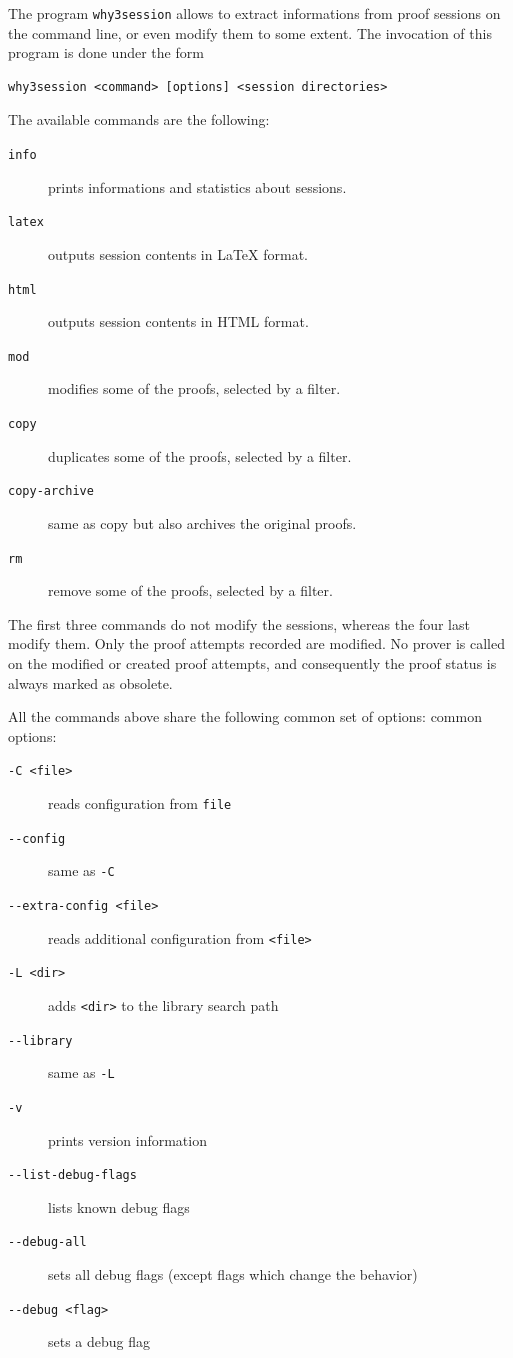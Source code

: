 The program \texttt{why3session} allows to extract informations from
proof sessions on the command line, or even modify them to some
extent. The invocation of this program is done under the form
\begin{verbatim}
why3session <command> [options] <session directories>
\end{verbatim}
The available commands are the following:
\begin{description}
\item[\texttt{info}] prints informations and statistics about sessions.
\item[\texttt{latex}] outputs session contents in LaTeX format.
\item[\texttt{html}] outputs session contents in HTML format.
\item[\texttt{mod}] modifies some of the proofs, selected by a filter.
\item[\texttt{copy}] duplicates some of the proofs, selected by a filter.
\item[\texttt{copy-archive}] same as copy but also archives the
  original proofs.
\item[\texttt{rm}] remove some of the proofs, selected by a filter.
\end{description}

The first three commands do not modify the sessions, whereas the four
last modify them. Only the proof attempts recorded are modified. No
prover is called on the modified or created proof attempts, and
consequently the proof status is always marked as obsolete.

All the commands above share the following common set of options:
common options:
\begin{description}
\item[\texttt{-C <file>}] reads configuration from \texttt{file}
\item[\texttt{-{}-config}]  same as \texttt{-C}
\item[\texttt{-{}-extra-config <file>}] reads additional configuration from \texttt{<file>}
\item[\texttt{-L <dir>}]              adds \texttt{<dir>} to the library search path
\item[\texttt{-{}-library}]             same as \texttt{-L}
\item[\texttt{-v}]                    prints version information
\item[\texttt{-{}-list-debug-flags}]    lists known debug flags
\item[\texttt{-{}-debug-all}]           sets all debug flags (except flags which change the behavior)
\item[\texttt{-{}-debug <flag>}]        sets a debug flag
\end{description}

